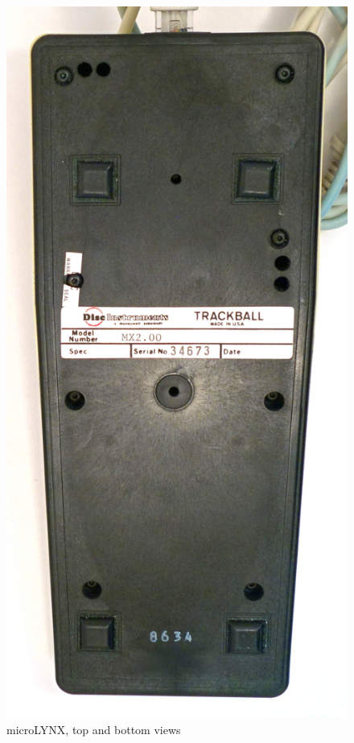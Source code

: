 \documentclass[11pt, a4paper]{article}
\begin{document}
\begin{figure}[h]
    \includegraphics[scale=0.4]{1986_honeywell_microlynx_trackball/bottom_30.jpg}
    \caption{microLYNX, top and bottom views}
    \label{fig:microLYNXTopBottom}
\end{figure}
\end{document}
